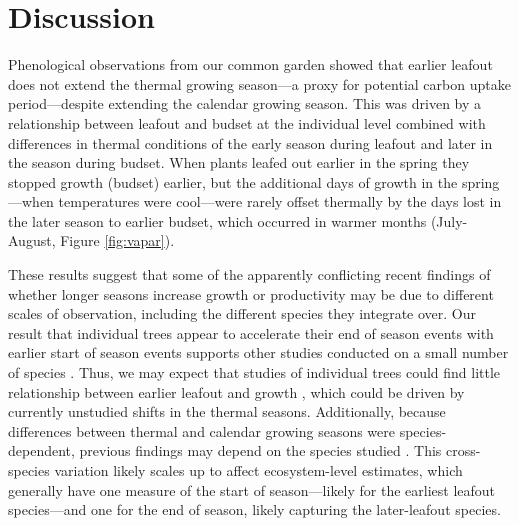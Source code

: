 \documentclass{article}[12pt]
\begin{document}
\section{Discussion}
Phenological observations from our common garden showed that earlier leafout does not extend the thermal growing season---a proxy for potential carbon uptake period---despite extending the calendar growing season. This was driven by a relationship between leafout and budset at the individual level combined with differences in thermal conditions of the early season during leafout and later in the season during budset. When plants leafed out earlier in the spring they stopped growth (budset) earlier, but the additional days of growth in the spring---when temperatures were cool---were rarely offset thermally by the days lost in the later season to earlier budset, which occurred in warmer months (July-August, Figure \ref{fig:vapar}). 

These results suggest that some of the apparently conflicting recent findings of whether longer seasons increase growth or productivity may be due to different scales of observation, including the different species they integrate over. Our result that individual trees appear to accelerate their end of season events with earlier start of season events supports other studies conducted on a small number of species \citep[using alternative metrics of senescence,][]{Liu2016,Zani2020}. Thus, we may expect that studies of individual trees could find little relationship between earlier leafout and growth \citep{cuny2012life,michelot2012comparing,Zani2020}, which could be driven by currently unstudied shifts in the thermal seasons. Additionally, because differences between thermal and calendar growing seasons were species-dependent, previous findings may depend on the species studied \citep{cuny2012life,michelot2012comparing}. This cross-species variation  likely scales up to affect ecosystem-level estimates, which generally have one measure of the start of season---likely for the earliest leafout species---and one for the end of season, likely capturing the later-leafout species. %
\end{document}
